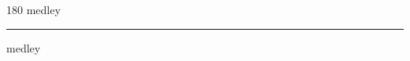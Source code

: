 
\begin{frame}
\begin{center}
\begin{turn}{180}
{\fontsize{2.5cm}{1em}\selectfont medley}
\end{turn}
\vspace{1em}\par  
\hrule
\vspace{1em}\par  
{\fontsize{2.5cm}{1em}\selectfont medley}
\end{center}
\end{frame}
